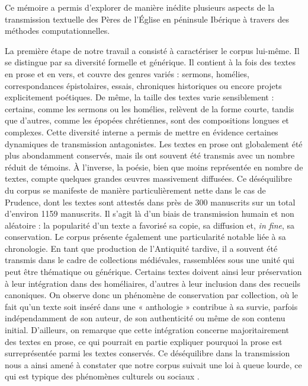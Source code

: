 \documentclass[a4paper,twoside,12pt]{book}
\begin{document}
Ce mémoire a permis d’explorer de manière inédite plusieurs aspects de la transmission textuelle des Pères de l’Église en péninsule Ibérique à travers des méthodes computationnelles.

La première étape de notre travail a consisté à caractériser le corpus lui-même. Il se distingue par sa diversité formelle et générique. Il contient à la fois des textes en prose et en vers, et couvre des genres variés : sermons, homélies, correspondances épistolaires, essais, chroniques historiques ou encore projets explicitement poétiques. De même, la taille des textes varie sensiblement : certains, comme les sermons ou les homélies, relèvent de la forme courte, tandis que d’autres, comme les épopées chrétiennes, sont des compositions longues et complexes.
Cette diversité interne a permis de mettre en évidence certaines dynamiques de transmission antagonistes. Les textes en prose ont globalement été plus abondamment conservés, mais ils ont souvent été transmis avec un nombre réduit de témoins. À l’inverse, la poésie, bien que moins représentée en nombre de textes, compte quelques grandes œuvres massivement diffusées. Ce déséquilibre du corpus se manifeste de manière particulièrement nette dans le cas de Prudence, dont les textes sont attestés dans près de 300 manuscrits sur un total d’environ 1159 manuscrits. Il s’agit là d’un biais de transmission humain et non aléatoire : la popularité d’un texte a favorisé sa copie, sa diffusion et, \textit{in fine}, sa conservation. 
Le corpus présente également une particularité notable liée à sa chronologie. En tant que production de l’Antiquité tardive, il a souvent été transmis dans le cadre de collections médiévales, rassemblées sous une unité qui peut être thématique ou générique. Certains textes doivent ainsi leur préservation à leur intégration dans des homéliaires, d’autres à leur inclusion dans des recueils canoniques. On observe donc un phénomène de conservation par collection, où le fait qu’un texte soit inséré dans une « anthologie » contribue à sa survie, parfois indépendamment de son auteur, de son authenticité ou même de son contenu initial. D’ailleurs, on remarque que cette intégration concerne majoritairement des textes en prose, ce qui pourrait en partie expliquer pourquoi la prose est surreprésentée parmi les textes conservés.
Ce déséquilibre dans la transmission nous a ainsi amené à constater que notre corpus suivait une loi à queue lourde, ce qui est typique des phénomènes culturels ou sociaux .
\end{document}
